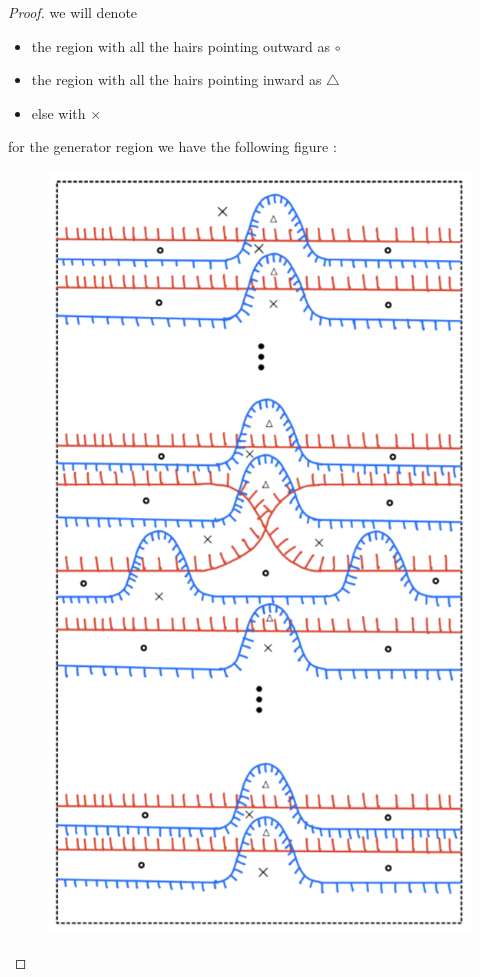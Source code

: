 \begin{proof}
we will denote
 
\begin{itemize}
\item the region with all the hairs pointing outward as $\circ$
\item the region with all the hairs pointing inward as $\bigtriangleup$
\item else with $\times$
\end{itemize}

for the generator region we have the following figure :

\begin{figure}[H] 
    \centering
    \includegraphics[scale = 0.95]{diagrams/natural_alternating_diagrams/11.png}
    \caption{}
    \label{fig:your-label}
\end{figure}


\end{proof}
